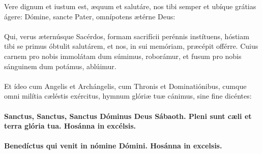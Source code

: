 \documentclass[12pt, a4paper]{article}
\begin{document}
	\\
	\\
	\\
	\\
	\\
	Vere dignum et iustum est, æquum
	et salutáre, nos tibi semper et
	ubíque grátias ágere: Dómine,
	sancte Pater, omnípotens ætérne
	Deus:
	\\\\
	Qui, verus æternúsque Sacérdos,
	formam sacrifícii perénnis
	instítuens, hóstiam tibi se primus
	óbtulit salutárem, et nos, in sui
	memóriam, præcépit offérre. Cuius
	carnem pro nobis immolátam dum
	súmimus, roborámur, et fusum pro
	nobis sánguinem dum potámus,
	ablúimur.
	\\\\
	Et ídeo cum Angelis et
	Archángelis, cum Thronis et
	Dominatiónibus, cumque omni
	milítia cæléstis exércitus, hymnum
	glóriæ tuæ cánimus, sine fine
	dicéntes:
	\\\\
	\textbf{Sanctus, Sanctus, Sanctus Dóminus
		Deus Sábaoth. Pleni sunt cæli et
		terra glória tua. Hosánna in
		excélsis.}
	\\\\
	\textbf{Benedíctus qui venit in nómine
		Dómini. Hosánna in excelsis.}
	
	\newpage
	
\end{document}
